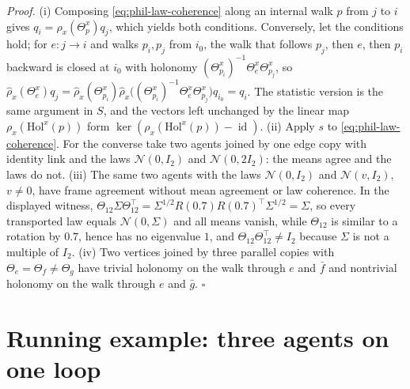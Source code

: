 \noindent\emph{Proof.}
(i) Composing \eqref{eq:phil-law-coherence} along an internal walk $p$ from $j$ to $i$ gives
$q_i=\widehat\rho_x(\Theta^x_p)q_j$, which yields both conditions. Conversely, let the
conditions hold; for $e:j\to i$ and walks $p_i,p_j$ from $i_0$, the walk that follows $p_j$, then $e$,
then $p_i$ backward is closed at $i_0$ with holonomy $(\Theta_{p_i}^x)^{-1}\Theta_e^x\Theta_{p_j}^x$, so
$\widehat\rho_x(\Theta_e^x)q_j=\widehat\rho_x(\Theta^x_{p_i})\widehat\rho_x\bigl((\Theta_{p_i}^x)^{-1}\Theta_e^x\Theta_{p_j}^x\bigr)q_{i_0}=q_i$.
The statistic version is the same argument in $S$, and the vectors left unchanged by the linear map
$\rho_x(\mathrm{Hol}^x(p))$ form $\ker(\rho_x(\mathrm{Hol}^x(p))-\operatorname{id})$. (ii) Apply $s$ to
\eqref{eq:phil-law-coherence}. For the converse take two agents joined by one edge copy with identity
link and the laws $\mathcal N(0,I_2)$ and $\mathcal N(0,2I_2)$: the means agree and the laws do not.
(iii) The same two agents with the laws $\mathcal N(0,I_2)$ and $\mathcal N(v,I_2)$, $v\neq0$, have frame
agreement without mean agreement or law coherence. In the displayed witness,
$\Theta_{12}\Sigma\Theta_{12}^\top=\Sigma^{1/2}R(0.7)R(0.7)^\top\Sigma^{1/2}=\Sigma$, so every transported
law equals $\mathcal N(0,\Sigma)$ and all means vanish, while $\Theta_{12}$ is similar to a rotation by
$0.7$, hence has no eigenvalue $1$, and $\Theta_{12}\Theta_{12}^\top\neq I_2$ because $\Sigma$ is not
a multiple of $I_2$. (iv) Two vertices joined by three parallel copies with $\Theta_e=\Theta_f\neq\Theta_g$
have trivial holonomy on the walk through $e$ and $\bar f$ and nontrivial holonomy on the walk through
$e$ and $\bar g$. \hfill$\square$

\section{Running example: three agents on one loop}
\label{sec:geo-running-example}

